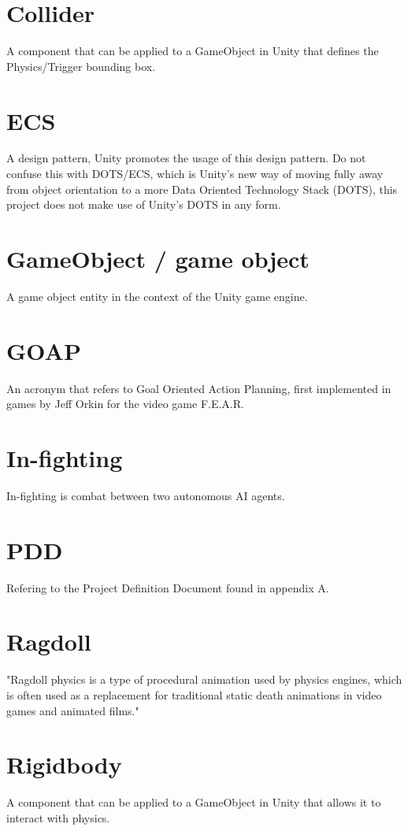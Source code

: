 \documentclass[11pt]{report}
\begin{document}
\section{Collider}
A component that can be applied to a GameObject in Unity that defines the Physics/Trigger bounding box.

\section{ECS}
A design pattern, Unity promotes the usage of this design pattern. Do not confuse this with DOTS/ECS, which is Unity's new way of moving fully away from object orientation to a more Data Oriented Technology Stack (DOTS), this project does not make use of Unity's DOTS in any form.

\section{GameObject / game object}
A game object entity in the context of the Unity game engine.

\section{GOAP}
An acronym that refers to Goal Oriented Action Planning, first implemented in games by Jeff Orkin for the video game F.E.A.R. \cite{goap}

\section{In-fighting}
In-fighting is combat between two autonomous AI agents.

\section{PDD}
Refering to the Project Definition Document found in appendix A.

\section{Ragdoll}
"Ragdoll physics is a type of procedural animation used by physics engines, which is often used as a replacement for traditional static death animations in video games and animated films." \cite{ragdollDefinition}

\section{Rigidbody}
A component that can be applied to a GameObject in Unity that allows it to interact with physics.
\end{document}
